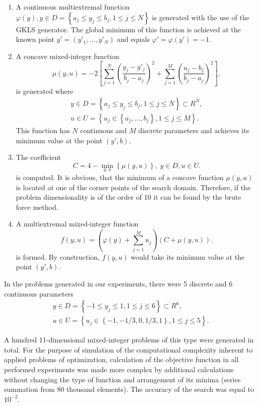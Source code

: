 \documentclass{llncs}
\begin{document}
\begin{enumerate}
	\item A continuous multiextremal function $\varphi(y), y\in D = \left\{ a_j\leq 
y_j\leq b_j, 1\leq j \leq N \right\}$ is generated with the use of the GKLS generator. The global 
minimum of this function is achieved at the known point $y'=(y'_1,...,y'_N)$ and equals 
$\varphi'=\varphi(y')=-1$.
	\item A concave mixed-integer function 
	\[
			\mu(y,u) = -2 \left[ \sum_{j=1}^N \left( \frac{y_j - y'_j}{b_j-a_j} 
\right)^2 + \sum_{j=1}^M \left( \frac{u_j - b_j}{b_j-a_j} \right)^2 \right],
	\]
	is generated where 
	\begin{gather}
	y\in D = \left\{ a_j\leq y_j\leq b_j, 1\leq j \leq N \right\} \subset R^N,\nonumber \\
	u\in U = \left\{ u_j \in  \left\{a_j, ..., b_j \right\}, 1\leq j \leq M \right\}.\nonumber
	\end{gather}
	This function has $N$ continuous and $M$ discrete parameters and achieves its 
minimum value at the point $(y',b)$.
	\item The coefficient 
	\[
	C = 4 - \min_{y,u} \left\{ \mu(y,u) \right\}, \; y\in D, u \in U.
	\]
	is computed. 
It is obvious, that the minimum of a concave function $\mu(y,u)$ is located at one of the corner 
points of the search domain. Therefore, if the problem dimensionality is of the order of 10 it can 
be found by the brute force method.
	\item A multiextremal mixed-integer function 
	\[
	f(y,u) = \left(\varphi(y) + \sum_{j=1}^M{u_j}\right)\left(C + \mu(y,u)\right).
	\]
	is formed.
By construction, $f(y,u)$ would take its minimum value at the point $(y',b)$.
	
\end{enumerate}


In the problems generated in our experiments, there were 5 discrete and 6 continuous 
parameters 
	\begin{gather}
	y\in D = \left\{ -1 \leq y_j\leq 1, 1\leq j \leq 6 \right\} \subset R^6,\nonumber \\
	u\in U = \left\{ u_j \in  \left\{-1, -1/3, 0, 1/3, 1 \right\}, 1\leq j \leq 5 \right\}.\nonumber
	\end{gather}

A hundred 11-dimensional mixed-integer problems of this type were generated in total. 
For the purpose of simulation of the computational complexity inherent to
applied problems of optimization, calculation of the objective function in all performed
experiments was made more complex by additional calculations without changing the type
of function and arrangement of its minima (series summation from 80 thousand elements).
The accuracy of the search was equal to $10^{-2}$.%
\end{document}
